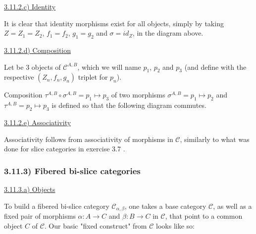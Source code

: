 \documentclass[12pt, letterpaper, twoside]{report}
\begin{document}
\vspace{5mm}
\underline{3.11.2.c) Identity}

It is clear that identity morphisms exist for all objects, simply by taking $Z = Z_1 = Z_2$, $f_1 = f_2$, $g_1 = g_2$ and $\sigma = id_Z$, in the diagram above.

\vspace{5mm}
\underline{3.11.2.d) Composition}

Let be 3 objects of $\mathcal{C}^{A,B}$, which we will name $p_1$, $p_2$ and $p_3$ (and define with the respective $(Z_n, f_n, g_n)$ triplet for $p_n$).

Composition $\tau^{A, B} \circ \sigma^{A, B} = p_1 \mapsto p_3$ of two morphisms $\sigma^{A, B} = p_1 \mapsto p_2$ and $\tau^{A, B} = p_2 \mapsto p_3$ is defined so that the following diagram commutes.


\vspace{5mm}
\underline{3.11.2.e) Associativity}

Associativity follows from associativity of morphisms in $\mathcal{C}$, similarly to what was done for slice categories in exercise 3.7 .



\subsubsection*{3.11.3) Fibered bi-slice categories}

\vspace{5mm}
\underline{3.11.3.a) Objects}

To build a fibered bi-slice category $\mathcal{C}_{\alpha, \beta}$, one takes a base category $\mathcal{C}$, as well as a fixed pair of morphisms $\alpha : A \to C$ and $\beta : B \to C$ in $\mathcal{C}$, that point to a common object $C$ of $\mathcal{C}$. Our basic "fixed construct" from $\mathcal{C}$ looks like so: 
\end{document}
